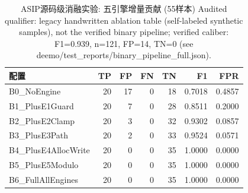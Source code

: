 \begin{table}[htbp]
\centering
\caption{ASIP源码级消融实验: 五引擎增量贡献 (55样本) Audited qualifier: legacy handwritten ablation table (self-labeled synthetic samples), not the verified binary pipeline; verified caliber: F1=0.939, n=121, FP=14, TN=0 (see deemo/test_reports/binary_pipeline_full.json).}
\label{tab:asip_ablation}
\begin{tabular}{lrrrrrr}
\toprule
配置 & TP & FP & FN & TN & F1 & FPR \\
\midrule
B0_NoEngine & 20 & 17 & 0 & 18 & 0.7018 & 0.4857 \\
B1_PlusE1Guard & 20 & 7 & 0 & 28 & 0.8511 & 0.2000 \\
B2_PlusE2Clamp & 20 & 3 & 0 & 32 & 0.9302 & 0.0857 \\
B3_PlusE3Path & 20 & 2 & 0 & 33 & 0.9524 & 0.0571 \\
B4_PlusE4AllocWrite & 20 & 0 & 0 & 35 & 1.0000 & 0.0000 \\ %
B5_PlusE5Modulo & 20 & 0 & 0 & 35 & 1.0000 & 0.0000 \\ %
B6_FullAllEngines & 20 & 0 & 0 & 35 & 1.0000 & 0.0000 \\ %
\bottomrule
\end{tabular}
\end{table}